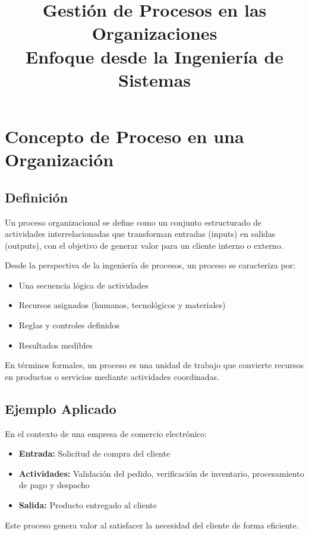 \documentclass[12pt,a4paper]{article}
\title{Gestión de Procesos en las Organizaciones \\ \large Enfoque desde la Ingeniería de Sistemas}
\author{}
\date{}
\begin{document}
\maketitle

\section{Concepto de Proceso en una Organización}

\subsection{Definición}

Un proceso organizacional se define como un conjunto estructurado de actividades interrelacionadas que transforman entradas (inputs) en salidas (outputs), con el objetivo de generar valor para un cliente interno o externo.

Desde la perspectiva de la ingeniería de procesos, un proceso se caracteriza por:

\begin{itemize}
    \item Una secuencia lógica de actividades
    \item Recursos asignados (humanos, tecnológicos y materiales)
    \item Reglas y controles definidos
    \item Resultados medibles
\end{itemize}

En términos formales, un proceso es una unidad de trabajo que convierte recursos en productos o servicios mediante actividades coordinadas.

\subsection{Ejemplo Aplicado}

En el contexto de una empresa de comercio electrónico:

\begin{itemize}
    \item \textbf{Entrada:} Solicitud de compra del cliente
    \item \textbf{Actividades:} Validación del pedido, verificación de inventario, procesamiento de pago y despacho
    \item \textbf{Salida:} Producto entregado al cliente
\end{itemize}

Este proceso genera valor al satisfacer la necesidad del cliente de forma eficiente.
\end{document}
